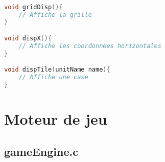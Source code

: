 \documentclass[a4paper,10pt]{extreport}
\begin{document}
\begin{lstlisting}[language=c]

void gridDisp(){
	// Affiche la grille
}

void dispX(){
	// Affiche les coordonnees horizontales
}

void dispTile(unitName name){
	// Affiche une case
}

\end{lstlisting}

\part{Moteur de jeu}

\chapter{gameEngine.c}
\vspace{-1cm}
\end{document}
